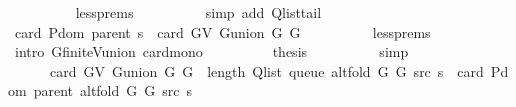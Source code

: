 \begin{isabellebody}
\ \ \ \ \ \ \ \ \isamarkupfalse%
\ less{\isachardot}{\kern0pt}prems{\isacharparenleft}{\kern0pt}{}{\isacharparenright}{\kern0pt}\isanewline
\ \ \ \ \ \ \ \ \isamarkupfalse%
\ {\isacharparenleft}{\kern0pt}simp\ add{\isacharcolon}{\kern0pt}\ Q{\isachardot}{\kern0pt}list{\isacharunderscore}{\kern0pt}tail{\isacharparenright}{\kern0pt}\isanewline
\ \ \ \ \ \ \isamarkupfalse%
\ \isamarkupfalse%
\ {\isachardoublequoteopen}card\ {\isacharparenleft}{\kern0pt}P{\isachardot}{\kern0pt}dom\ {\isacharparenleft}{\kern0pt}parent\ s{\isacharparenright}{\kern0pt}{\isacharparenright}{\kern0pt}\ {\isasymle}\ card\ {\isacharparenleft}{\kern0pt}G{\isachardot}{\kern0pt}V\ {\isacharparenleft}{\kern0pt}G{\isachardot}{\kern0pt}union\ G{}\ G{}{\isacharparenright}{\kern0pt}{\isacharparenright}{\kern0pt}{\isachardoublequoteclose}\isanewline
\ \ \ \ \ \ \ \ \isamarkupfalse%
\ less{\isachardot}{\kern0pt}prems{\isacharparenleft}{\kern0pt}{}{\isacharcomma}{\kern0pt}\ {}{\isacharcomma}{\kern0pt}\ {}{\isacharparenright}{\kern0pt}\isanewline
\ \ \ \ \ \ \ \ \isamarkupfalse%
\ {\isacharparenleft}{\kern0pt}intro\ G{\isachardot}{\kern0pt}finite{\isacharunderscore}{\kern0pt}V{\isacharunderscore}{\kern0pt}union\ card{\isacharunderscore}{\kern0pt}mono{\isacharparenright}{\kern0pt}\isanewline
\ \ \ \ \ \ \isamarkupfalse%
\ \isamarkupfalse%
\ {\isacharquery}{\kern0pt}thesis\isanewline
\ \ \ \ \ \ \ \ \isamarkupfalse%
\ simp\isanewline
\ \ \ \ \isamarkupfalse%
\isanewline
\ \ \ \ \isamarkupfalse%
\ \isamarkupfalse%
\isanewline
\ \ \ \ \ \ {\isachardoublequoteopen}card\ {\isacharparenleft}{\kern0pt}G{\isachardot}{\kern0pt}V\ {\isacharparenleft}{\kern0pt}G{\isachardot}{\kern0pt}union\ G{}\ G{}{\isacharparenright}{\kern0pt}{\isacharparenright}{\kern0pt}\ {\isacharplus}{\kern0pt}\ length\ {\isacharparenleft}{\kern0pt}Q{\isacharunderscore}{\kern0pt}list\ {\isacharparenleft}{\kern0pt}queue\ {\isacharparenleft}{\kern0pt}alt{\isacharunderscore}{\kern0pt}fold\ G{}\ G{}\ src\ s{\isacharparenright}{\kern0pt}{\isacharparenright}{\kern0pt}{\isacharparenright}{\kern0pt}\ {\isacharminus}{\kern0pt}\ card\ {\isacharparenleft}{\kern0pt}P{\isachardot}{\kern0pt}dom\ {\isacharparenleft}{\kern0pt}parent\ {\isacharparenleft}{\kern0pt}alt{\isacharunderscore}{\kern0pt}fold\ G{}\ G{}\ src\ s{\isacharparenright}{\kern0pt}{\isacharparenright}{\kern0pt}{\isacharparenright}{\kern0pt}\ {\isacharless}{\kern0pt}\isanewline

\end{isabellebody}

